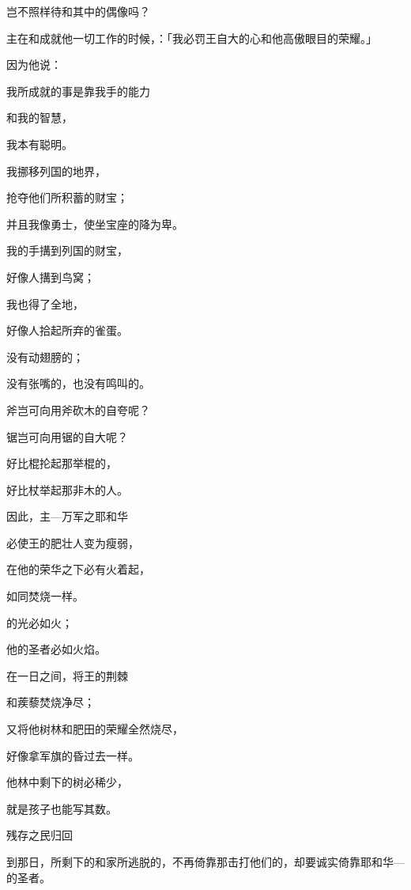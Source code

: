 {\par }{\Q 岂不照样待{}和其中的偶像吗？
\par }{\PP {}主在{}和{}成就他一切工作的时候，{}：「我必罚{}王自大的心和他高傲眼目的荣耀。」
\par }{\Q {}因为他说：
\par }{\Q 我所成就的事是靠我手的能力
\par }{\Q 和我的智慧，
\par }{\Q 我本有聪明。
\par }{\Q 我挪移列国的地界，
\par }{\Q 抢夺他们所积蓄的财宝；
\par }{\Q 并且我像勇士，使坐宝座的降为卑。
\par }{\Q {}我的手搆到列国的财宝，
\par }{\Q 好像人搆到鸟窝；
\par }{\Q 我也得了全地，
\par }{\Q 好像人拾起所弃的雀蛋。
\par }{\Q 没有动翅膀的；
\par }{\Q 没有张嘴的，也没有鸣叫的。
\par }{\BB \par }{\Q {}斧岂可向用斧砍木的自夸呢？
\par }{\Q 锯岂可向用锯的自大呢？
\par }{\Q 好比棍抡起那举棍的，
\par }{\Q 好比杖举起那非木的人。
\par }{\Q {}因此，主—万军之耶和华
\par }{\Q 必使{}王的肥壮人变为瘦弱，
\par }{\Q 在他的荣华之下必有火着起，
\par }{\Q 如同焚烧一样。
\par }{\Q {}的光必如火；
\par }{\Q 他的圣者必如火焰。
\par }{\Q 在一日之间，将{}王的荆棘
\par }{\Q 和蒺藜焚烧净尽；
\par }{\Q {}又将他树林和肥田的荣耀全然烧尽，
\par }{\Q 好像拿军旗的昏过去一样。
\par }{\Q {}他林中剩下的树必稀少，
\par }{\Q 就是孩子也能写其数。
\par }{\SH 残存之民归回
\par }{\PP {}到那日，{}所剩下的和{}家所逃脱的，不再倚靠那击打他们的，却要诚实倚靠耶和华—{}的圣者。
}
